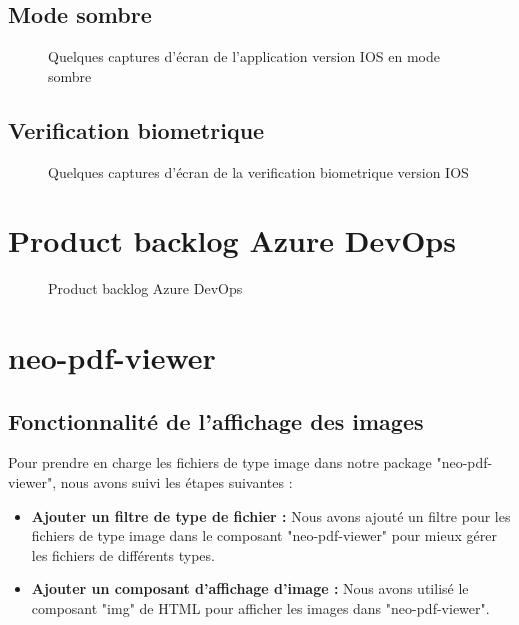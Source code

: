 \subsection{Mode sombre}
\begin{figure}[H]
    \centering
    \caption{Quelques captures d'écran de l'application version IOS en mode sombre}
    \label{appendix:capture_app1_ios}
\end{figure}
\label{appendix:sombre_ios}

\subsection{Verification biometrique}

\begin{figure}[H]
    \centering
    \caption{Quelques captures d'écran de la verification biometrique version IOS}
    \label{appendix:verification_biometrique}
\end{figure}





\section{Product backlog Azure DevOps}

\begin{figure}[H]
    \centering
    \caption{Product backlog Azure DevOps}
    \label{appendix:product_backlog_azure_devops}
\end{figure}




\section{neo-pdf-viewer}
\label{appendix:neo-pdf-viewer}

\subsection{Fonctionnalité de l'affichage des images}

Pour prendre en charge les fichiers de type image dans notre package "neo-pdf-viewer", nous avons suivi les étapes suivantes :
\begin{itemize}
    \item \textbf{Ajouter un filtre de type de fichier :} Nous avons ajouté un filtre pour les fichiers de type image dans le composant "neo-pdf-viewer" pour mieux gérer les fichiers de différents types.
    \item \textbf{Ajouter un composant d'affichage d'image :} Nous avons utilisé le composant "img" de HTML pour afficher les images dans "neo-pdf-viewer".
\end{itemize}

